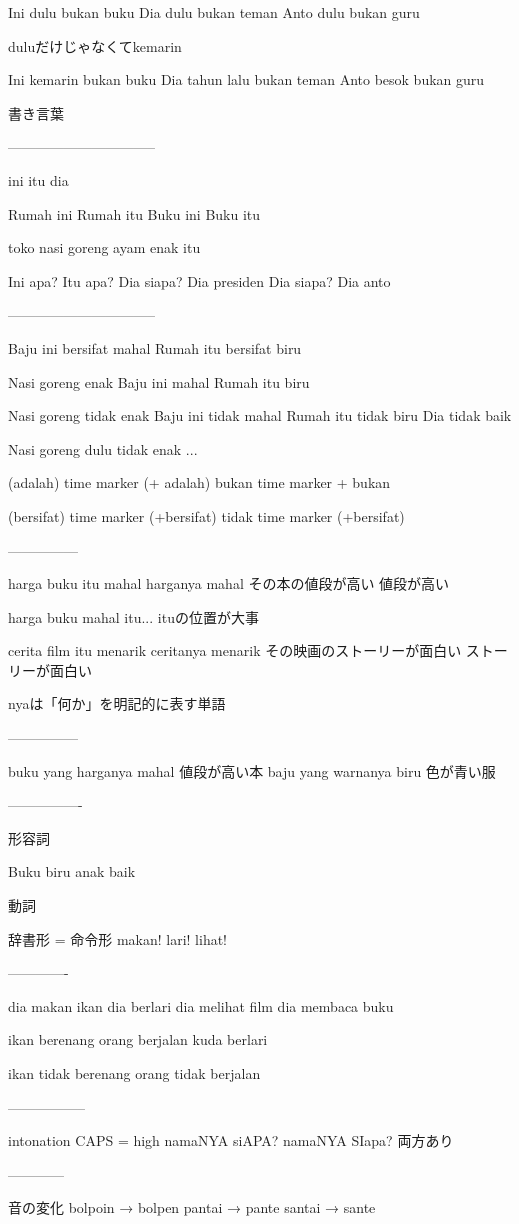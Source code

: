 \documentclass[uplatex]{jsarticle}
\theoremstyle{definition}
\begin{document}
Ini dulu bukan buku Dia dulu bukan teman Anto dulu bukan guru

duluだけじゃなくてkemarin

Ini kemarin bukan buku Dia tahun lalu bukan teman Anto besok bukan guru

書き言葉

--------------------------------

ini itu dia

Rumah ini Rumah itu Buku ini Buku itu

toko nasi goreng ayam enak itu

Ini apa?  Itu apa?  Dia siapa?  Dia presiden Dia siapa?  Dia anto

--------------------------------

Baju ini bersifat mahal Rumah itu bersifat biru

Nasi goreng enak Baju ini mahal Rumah itu biru

Nasi goreng tidak enak Baju ini tidak mahal Rumah itu tidak biru Dia
tidak baik

Nasi goreng dulu tidak enak
...


(adalah) time marker (+ adalah) bukan time marker + bukan

(bersifat) time marker (+bersifat) tidak time marker (+bersifat)

---------------

harga buku itu mahal harganya mahal その本の値段が高い 値段が高い

harga buku mahal itu...  ituの位置が大事

cerita film itu menarik ceritanya menarik その映画のストーリーが面白い
ストーリーが面白い

nyaは「何か」を明記的に表す単語

---------------

buku yang harganya mahal 値段が高い本 baju yang warnanya biru 色が青い服

----------------

形容詞

Buku biru anak baik

動詞

辞書形 = 命令形 makan!  lari!  lihat!

-------------

dia makan ikan dia berlari dia melihat film dia membaca buku

ikan berenang orang berjalan kuda berlari

ikan tidak berenang orang tidak berjalan

-----------------

intonation CAPS = high namaNYA siAPA?  namaNYA SIapa?  両方あり

------------

音の変化 bolpoin → bolpen pantai → pante santai → sante
\end{document}
